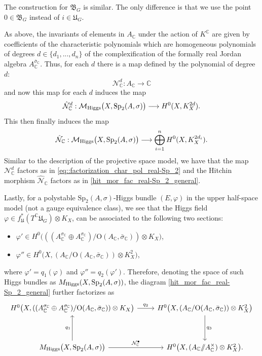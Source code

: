 \documentclass[oneside,11pt]{amsart}
\theoremstyle{definition}
\theoremstyle{remark}
\numberwithin{thm}{section}
\numberwithin{equation}{section}
\begin{document}
The construction for $\mathfrak{B}_G$ is similar. The only difference is that we use the point $0\in\mathfrak{B}_G$ instead of $i\in\mathfrak{U}_G$.

As above, the invariants of elements in $A_\mathbb C$ under the action of $K^{\mathbb{C}}$ are given by coefficients of the characteristic polynomials which are homogeneous polynomials of degrees $d \in \{d_1, ..., d_n\}$ of the complexification of the formally real Jordan algebra $A_{\mathbb C}^{\bar\sigma_{\mathbb C}}$. Thus, for each $d$ there is a map defined by the polynomial of degree $d$:
\[\mathcal{N}_{\mathbb{C}}^d\colon A_{\mathbb{C}} \longrightarrow \mathbb{C}\]
and now this map for each $d$ induces the map
\[
\hat{\mathcal{N}}_{\mathbb{C}}^{d}:\mathcal{M}_{\rm Higgs}\bigl(X,\mathrm{Sp}_2(A,\sigma)\bigr)\longrightarrow H^{0}(X,K_X^{2d}).
\]
This then finally induces the map
\[
\hat{\mathcal{N}}_{\mathbb{C}}:\mathcal{M}_{\rm Higgs}\bigl(X,\mathrm{Sp}_2(A,\sigma)\bigr)
\longrightarrow \bigoplus_{i=1}^{n}H^{0}(X,K_X^{2d_i}).
\]
Similar to the description of the projective space model, we have that the map $\mathcal{N}_{\mathbb{C}}^{d}$ factors as in \eqref{eq::factorization_char_pol_real-Sp_2} and the Hitchin morphism $\hat{\mathcal{N}}_{\mathbb{C}}$ factors as in \eqref{hit_mor_fac_real-Sp_2_general}.

Lastly, for a polystable $\mathrm{Sp}_2(A,\sigma)$-Higgs bundle $(E,\varphi)$ in the upper half-space model (not a gauge equivalence class), we see that the Higgs field $\varphi\in f_{\mathfrak{U}}^{*}(T^{\mathbb{C}}\mathfrak{U}_{G})\otimes K_{X}$, can be associated to the following two sections:
\begin{itemize}
\item $\varphi'\in H^{0}\bigl(((A_{\mathbb C}^{\sigma_{\mathbb C}}\oplus A_{\mathbb C}^{\sigma_{\mathbb C}})/\mathrm{O}(A_{\mathbb C},\bar\sigma_{\mathbb C}))\otimes K_X\bigr)$,
\item $\varphi''\in H^{0}\bigl(X,(A_{\mathbb{C}}/\mathrm{O}(A_{\mathbb C},\bar\sigma_{\mathbb C}))\otimes K_X^{2}\bigr)$,
\end{itemize}
where $\varphi'=q_{1}(\varphi)$ and $\varphi''=q_{2}(\varphi')$. Therefore, denoting the space of such Higgs bundles as $M_{\rm Higgs}(X,\mathrm{Sp}_{2}(A,\sigma))$, the diagram \eqref{hit_mor_fac_real-Sp_2_general} further factorizes as
\begin{equation}
\begin{tikzcd}
H^{0}\bigl(X,((A_{\mathbb C}^{\sigma_{\mathbb C}}\oplus A_{\mathbb C}^{\sigma_{\mathbb C}})/\mathrm{O}(A_{\mathbb C},\bar\sigma_{\mathbb C}))\otimes K_{X}\bigr)
\arrow[r,"q_{2}"]& H^{0}\bigl(X,(A_{\mathbb{C}}/\mathrm{O}(A_{\mathbb C},\bar\sigma_{\mathbb C}))\otimes K_{X}^{2}\bigr)
\arrow[dd,"q_{3}"]
\\
\\
M_{\rm Higgs}\bigl(X,\mathrm{Sp}_2(A,\sigma)\bigr)
\arrow[uu,"q_{1}"]
\arrow[r,"\mathcal{N}_{\mathbb{C}}^{\bullet}"]&H^{0}\bigl(X,(A_{\mathbb{C}}/\!\!/A_{\mathbb{C}}^\times)\otimes K_{X}^{2}\bigr).
\end{tikzcd}
\end{equation}
\end{document}
